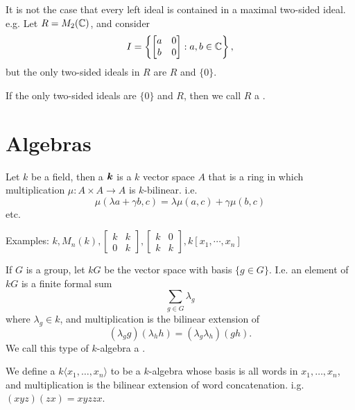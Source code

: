    It is not the case that every left ideal is contained in a
  maximal two-sided ideal. e.g. Let $R = M_2(\mathbb{C})$, and consider
  \[ I = \left\{ \begin{bmatrix} a & 0 \\ b & 0 \end{bmatrix} : a,b\in \mathbb{C} \right\}, \]
  but the only two-sided ideals in $R$ are $R$ and $\{0\}$.

  \begin{define}
    If the only two-sided ideals are $\{0\}$ and $R$, then we call $R$ a
    .
  \end{define}

\section{Algebras}

  \begin{define}
    Let $k$ be a field, then a $\boldsymbol{k}$ is a $k$ vector space $A$
    that is a ring in which multiplication $\mu: A \times A \to A$ is
    $k$-bilinear. i.e.
    \[\mu(\lambda a + \gamma b, c) = \lambda\mu(a,c) + \gamma\mu(b,c) \]
    etc.
  \end{define}

  Examples: $k, M_n(k), \begin{bmatrix} k & k \\ 0 & k \end{bmatrix},
    \begin{bmatrix} k & 0 \\ k & k \end{bmatrix}, k[x_1,\cdots,x_n]$

  \begin{define}
    If $G$ is a group, let $kG$ be the vector space with basis $\{g \in G\}$.
    I.e. an element of $kG$ is a finite formal sum
    \[ \sum_{g \in G} \lambda_g \]
    where $\lambda_g \in k$, and multiplication is the bilinear extension of
    \[ (\lambda_g g) (\lambda_h h) = (\lambda_g \lambda_h) (g h). \]
    We call this type of $k$-algebra a .
  \end{define}

  \begin{define}
    We define a  $k\langle x_1,\ldots,x_n\rangle$
    to be a $k$-algebra whose basis is all words in $x_1,\ldots,x_n$,
    and multiplication is the bilinear extension of word concatenation.
    i.g. $(xyz)(zx) = xyzzx$.
  \end{define}

